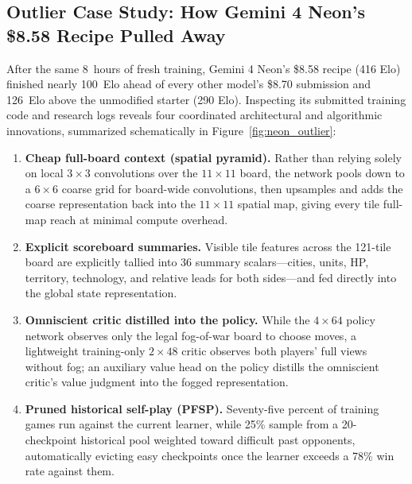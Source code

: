 \documentclass[11pt,letterpaper]{article}
\begin{document}
\subsection{Outlier Case Study: How Gemini 4 Neon's \$8.58 Recipe Pulled Away}
\label{sec:outlier}

After the same 8~hours of fresh training, Gemini 4 Neon's \$8.58 recipe (416 Elo) finished nearly 100~Elo ahead of every other model's \$8.70 submission and 126~Elo above the unmodified starter (290 Elo). Inspecting its submitted training code and research logs reveals four coordinated architectural and algorithmic innovations, summarized schematically in Figure~\ref{fig:neon_outlier}:

\begin{enumerate}[leftmargin=1.5em,itemsep=3pt]
  \item \textbf{Cheap full-board context (spatial pyramid).} Rather than relying solely on local $3{\times}3$ convolutions over the $11{\times}11$ board, the network pools down to a $6{\times}6$ coarse grid for board-wide convolutions, then upsamples and adds the coarse representation back into the $11{\times}11$ spatial map, giving every tile full-map reach at minimal compute overhead.
  \item \textbf{Explicit scoreboard summaries.} Visible tile features across the 121-tile board are explicitly tallied into 36 summary scalars---cities, units, HP, territory, technology, and relative leads for both sides---and fed directly into the global state representation.
  \item \textbf{Omniscient critic distilled into the policy.} While the $4{\times}64$ policy network observes only the legal fog-of-war board to choose moves, a lightweight training-only $2{\times}48$ critic observes both players' full views without fog; an auxiliary value head on the policy distills the omniscient critic's value judgment into the fogged representation.
  \item \textbf{Pruned historical self-play (PFSP).} Seventy-five percent of training games run against the current learner, while 25\% sample from a 20-checkpoint historical pool weighted toward difficult past opponents, automatically evicting easy checkpoints once the learner exceeds a 78\% win rate against them.
\end{enumerate}
\end{document}
